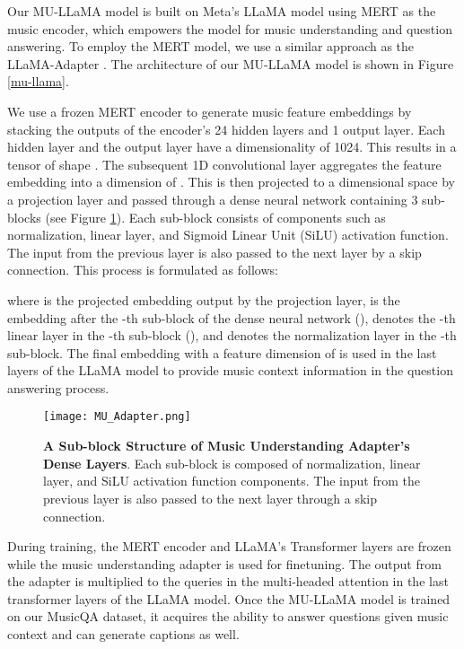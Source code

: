 \documentclass{article}
\begin{document}
\noindent
Our MU-LLaMA model is built on Meta's LLaMA\cite{touvron2023llama,touvron2023llama2} model using MERT \cite{li2023mert} as the music encoder, which empowers the model for music understanding and question answering. To employ the MERT model, we use a similar approach as the LLaMA-Adapter \cite{zhang2023llamaadapter}. The architecture of our MU-LLaMA model is shown in Figure \ref{mu-llama}.

We use a frozen MERT encoder to generate music feature embeddings by stacking the outputs of the encoder's 24 hidden layers and 1 output layer. Each hidden layer and the output layer have a dimensionality of 1024. This results in a tensor of shape . The subsequent 1D convolutional layer aggregates the feature embedding into a dimension of .  This is then projected to a  dimensional space by a projection layer and passed through a dense neural network containing 3 sub-blocks (see Figure \ref{mu-adapter}). Each sub-block consists of components such as normalization, linear layer, and Sigmoid Linear Unit (SiLU) activation function. The input from the previous layer is also passed to the next layer by a skip connection. This process is formulated as follows:
\vspace{-0.3cm}

\vspace{-0.5cm}

\noindent
where  is the projected embedding output by the projection layer,  is the embedding after the -th sub-block of the dense neural network (),  denotes the -th linear layer in the -th sub-block (), and  denotes the normalization layer in the -th sub-block. The final embedding  with a feature dimension of  is used in the last  layers of the LLaMA model to provide music context information in the question answering process.

\vspace{-0.2cm}
\begin{figure}[H]
\centering
\texttt{[image: MU\_Adapter.png]}
\caption{\textbf{A Sub-block Structure of Music Understanding Adapter's Dense Layers}. Each sub-block is composed of normalization, linear layer, and SiLU activation function components. The input from the previous layer is also passed to the next layer through a skip connection.}
\label{mu-adapter}
\end{figure}
\vspace{-0.3cm}

During training, the MERT encoder \cite{li2023mert} and LLaMA's \cite{touvron2023llama} Transformer layers are frozen while the music understanding adapter is used for finetuning. The output from the adapter is multiplied to the queries in the multi-headed attention in the last  transformer layers of the LLaMA model. Once the MU-LLaMA model is trained on our MusicQA dataset, it acquires the ability to answer questions given music context and can generate captions as well.
\end{document}
